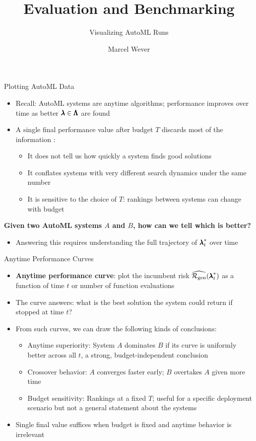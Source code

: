 \documentclass[main]{subfiles}
\title[Evaluation and Benchmarking]{Evaluation and Benchmarking}
\subtitle{Visualizing AutoML Runs}
\author[Marcel Wever]{Marcel Wever}
\date{}
\begin{document}
	
	\maketitle
	

\begin{frame}[c]{Plotting AutoML Data}
\begin{itemize}
    \item \alert{Recall}: AutoML systems are anytime algorithms; performance improves over time as better $\pmb{\lambda} \in \pmb{\Lambda}$ are found
    \item A single final performance value after budget $T$ discards most of the information :
    \begin{itemize}
        \item It does not tell us how quickly a system finds good solutions
        \item It conflates systems with very different search dynamics under the same number
        \item It is sensitive to the choice of $T$: rankings between systems can change with budget
    \end{itemize}
\end{itemize}
\begin{center}
\textbf{Given two AutoML systems $A$ and $B$, how can we tell which is better?}
\end{center}
\begin{itemize}
    \item Answering this requires understanding the full trajectory of ${\pmb{\lambda}}^*_t$ over time
\end{itemize}
\end{frame}

\begin{frame}{Anytime Performance Curves}
\begin{itemize}
    \item \textbf{Anytime performance curve}: plot the incumbent risk $\widehat{\mathcal{R}_{\text{gen}}}({\pmb{\lambda}}^*_t)$ as a function of time $t$ or number of function evaluations
    \item The curve answers: what is the best solution the system could return if stopped at time $t$?
    \item From such curves, we can draw the following kinds of conclusions:
    \begin{itemize}
        \item Anytime superiority: System $A$ dominates $B$ if its curve is uniformly better across all $t$, a strong, budget-independent conclusion
        \item Crossover behavior: $A$ converges faster early; $B$ overtakes $A$ given more time
        \item Budget sensitivity: Rankings at a fixed $T$; useful for a specific deployment scenario but not a general statement about the systems
    \end{itemize}
    \item Single final value suffices when budget is fixed and anytime behavior is irrelevant
\end{itemize}
\end{frame}
\end{document}

